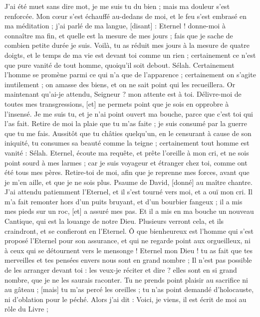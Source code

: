 \begin{multicols}{2}
J'ai été muet sans dire mot, je me suis tu du bien ; mais ma douleur s'est renforcée.
Mon cœur s'est échauffé au-dedans de moi, et le feu s'est embrasé en ma méditation ; j'ai parlé de ma langue, [disant] :
Eternel ! donne-moi à connaître ma fin, et quelle est la mesure de mes jours ; fais que je sache de combien petite durée je suis.
Voilà, tu as réduit mes jours à la mesure de quatre doigts, et le temps de ma vie est devant toi comme un rien ; certainement ce n'est que pure vanité de tout homme, quoiqu'il soit debout. Sélah.
Certainement l'homme se promène parmi ce qui n'a que de l'apparence ; certainement on s'agite inutilement ; on amasse des biens, et on ne sait point qui les recueillera.
Or maintenant qu'ai-je attendu, Seigneur ? mon attente est à toi.
Délivre-moi de toutes mes transgressions, [et] ne permets point que je sois en opprobre à l'insensé.
Je me suis tu, et je n'ai point ouvert ma bouche, parce que c'est toi qui l'as fait.
Retire de moi la plaie que tu m'as faite ; je suis consumé par la guerre que tu me fais.
Aussitôt que tu châties quelqu'un, en le censurant à cause de son iniquité, tu consumes sa beauté comme la teigne ; certainement tout homme est vanité : Sélah.
Eternel, écoute ma requête, et prête l'oreille à mon cri, et ne sois point sourd à mes larmes ; car je suis voyageur et étranger chez toi, comme ont été tous mes pères.
Retire-toi de moi, afin que je reprenne mes forces, avant que je m'en aille, et que je ne sois plus.
\VerseOne{}Psaume de David, [donné] au maître chantre. J'ai attendu patiemment l'Eternel, et il s'est tourné vers moi, et a ouï mon cri.
Il m'a fait remonter hors d'un puits bruyant, et d'un bourbier fangeux ; il a mis mes pieds sur un roc, [et] a assuré mes pas.
Et il a mis en ma bouche un nouveau Cantique, qui est la louange de notre Dieu. Plusieurs verront cela, et ils craindront, et se confieront en l'Eternel.
Ô que bienheureux est l'homme qui s'est proposé l'Eternel pour son assurance, et qui ne regarde point aux orgueilleux, ni à ceux qui se détournent vers le mensonge !
Eternel mon Dieu ! tu as fait que tes merveilles et tes pensées envers nous sont en grand nombre ; Il n'est pas possible de les arranger devant toi : les veux-je réciter et dire ? elles sont en si grand nombre, que je ne les saurais raconter.
Tu ne prends point plaisir au sacrifice ni au gâteau ; [mais] tu m'as percé les oreilles ; tu n'as point demandé d'holocauste, ni d'oblation pour le péché.
Alors j'ai dit : Voici, je viens, il est écrit de moi au rôle du Livre ;

\end{multicols}
